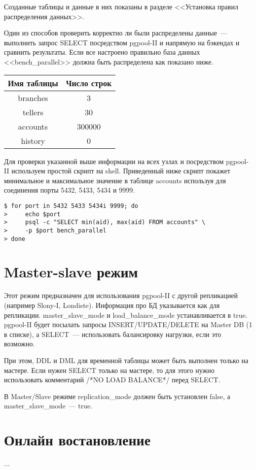 Созданные таблицы и данные в них показаны в разделе <<Установка правил распределения данных>>.

Один из способов проверить корректно ли были распределены данные~--- выполнить запрос SELECT посредством 
pgpool-II и напрямую на бэкендах и сравнить результаты. Если все настроено правильно база данных 
<<bench\_parallel>> должна быть распределена как показано ниже.

\begin{tabular}{ | c | c | }
  \hline
  Имя таблицы & Число строк \\
  \hline
  branches & 3 \\
  \hline
  tellers & 30 \\
  \hline
  accounts & 300000 \\
  \hline
  history & 0 \\
  \hline
\end{tabular}

Для проверки указанной выше информации на всех узлах и посредством pgpool-II используем простой скрипт на shell. 
Приведенный ниже скрипт покажет минимальное и максимальное значение в таблице accounts используя для соединения 
порты 5432, 5433, 5434 и 9999.
\begin{verbatim}
$ for port in 5432 5433 5434i 9999; do
>     echo $port
>     psql -c "SELECT min(aid), max(aid) FROM accounts" \
>     -p $port bench_parallel
> done
\end{verbatim}


\section{Master-slave режим}
Этот режим предназначен для использования pgpool-II с другой репликацией (например Slony-I, Londiste). 
Информация про БД указывается как для репликации. master\_slave\_mode и load\_balance\_mode устанавливается в true. 
pgpool-II будет посылать запросы INSERT/UPDATE/DELETE на Master DB (1 в списке), а SELECT~--- использовать балансировку 
нагрузки, если это возможно.

При этом, DDL и DML для временной таблицы может быть выполнен только на мастере. Если нужен SELECT только на мастере, то для этого 
нужно использовать комментарий /*NO LOAD BALANCE*/ перед SELECT.

В Master/Slave режиме replication\_mode должен быть установлен false, а master\_slave\_mode~--- true.

\section{Онлайн востановление}
...


